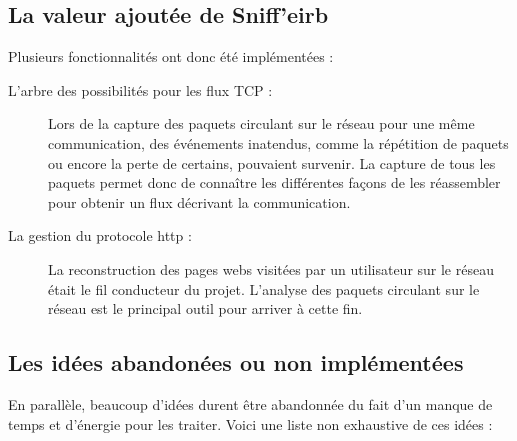 \subsection{La valeur ajoutée de Sniff'eirb}
Plusieurs fonctionnalités ont donc été implémentées :
\begin{description}
\item[L'arbre des possibilités pour les flux TCP :] Lors de la capture des paquets circulant sur le réseau pour une même communication, des événements inatendus, comme la répétition de paquets ou encore la perte de certains,  pouvaient survenir. La capture de tous les paquets permet donc de connaître les différentes façons de les réassembler pour obtenir un flux décrivant la communication. 
\item[La gestion du protocole http :] La reconstruction des pages webs visitées par un utilisateur sur le réseau était le fil conducteur du projet. L'analyse des paquets circulant sur le réseau est le principal outil pour arriver à cette fin.
\end{description}

\subsection{Les idées abandonées ou non implémentées}
En parallèle, beaucoup d'idées durent être abandonnée du fait d'un manque de temps et d'énergie pour les traiter. Voici une liste non exhaustive de ces idées :
